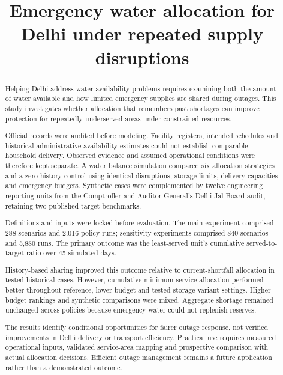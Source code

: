 \documentclass[conference]{IEEEtran}
\begin{document}
\title{Emergency water allocation for Delhi under repeated supply disruptions}
\maketitle
\begin{abstract}
Helping Delhi address water availability problems requires examining both the amount of water available and how limited emergency supplies are shared during outages. This study investigates whether allocation that remembers past shortages can improve protection for repeatedly underserved areas under constrained resources.

Official records were audited before modeling. Facility registers, intended schedules and historical administrative availability estimates could not establish comparable household delivery. Observed evidence and assumed operational conditions were therefore kept separate. A water balance simulation compared six allocation strategies and a zero-history control using identical disruptions, storage limits, delivery capacities and emergency budgets. Synthetic cases were complemented by twelve engineering reporting units from the Comptroller and Auditor General's Delhi Jal Board audit, retaining two published target benchmarks.

Definitions and inputs were locked before evaluation. The main experiment comprised 288 scenarios and 2,016 policy runs; sensitivity experiments comprised 840 scenarios and 5,880 runs. The primary outcome was the least-served unit's cumulative served-to-target ratio over 45 simulated days.

History-based sharing improved this outcome relative to current-shortfall allocation in tested historical cases. However, cumulative minimum-service allocation performed better throughout reference, lower-budget and tested storage-variant settings. Higher-budget rankings and synthetic comparisons were mixed. Aggregate shortage remained unchanged across policies because emergency water could not replenish reserves.

The results identify conditional opportunities for fairer outage response, not verified improvements in Delhi delivery or transport efficiency. Practical use requires measured operational inputs, validated service-area mapping and prospective comparison with actual allocation decisions. Efficient outage management remains a future application rather than a demonstrated outcome.

\end{abstract}
\end{document}
